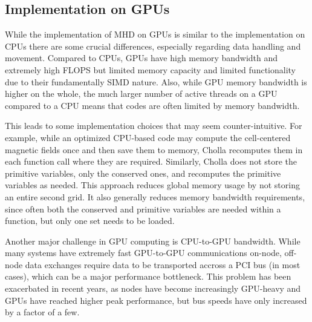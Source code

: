 \subsection{Implementation on GPUs}
\label{sec:gpu-vs-cpu}

While the implementation of MHD on GPUs is similar to the implementation on CPUs there are some crucial differences, especially regarding data handling and movement. Compared to CPUs, GPUs have high memory bandwidth and extremely high FLOPS but limited memory capacity and limited functionality due to their fundamentally SIMD nature. Also, while GPU memory bandwidth is higher on the whole, the much larger number of active threads on a GPU compared to a CPU means that codes are often limited by memory bandwidth.

This leads to some implementation choices that may seem counter-intuitive. For example, while an optimized CPU-based code may compute the cell-centered magnetic fields once and then save them to memory, Cholla recomputes them in each function call where they are required. Similarly, Cholla does not store the primitive variables, only the conserved ones, and recomputes the primitive variables as needed. This approach reduces global memory usage by not storing an entire second grid. It also generally reduces memory bandwidth requirements, since often both the conserved and primitive variables are needed within a function, but only one set needs to be loaded.

Another major challenge in GPU computing is CPU-to-GPU bandwidth. While many systems have extremely fast GPU-to-GPU communications on-node, off-node data exchanges require data to be transported accross a PCI bus (in most cases), which can be a major performance bottleneck. This problem has been exacerbated in recent years, as nodes have become increasingly GPU-heavy and GPUs have reached higher peak performance, but bus speeds have only increased by a factor of a few.

